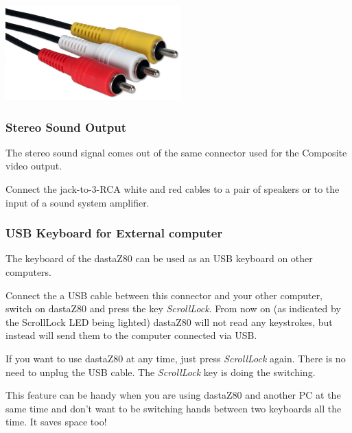         \centerline{\includegraphics[scale=0.5]{images/raspicable_rca.png}}

        \subsubsection{Stereo Sound Output}

        The stereo sound signal comes out of the same connector used for the
        Composite video output.

        Connect the jack-to-3-RCA white and red cables to a pair of speakers or
        to the input of a sound system amplifier.

        \subsubsection{USB Keyboard for External computer}

        The keyboard of the dastaZ80 can be used as an USB keyboard on other
        computers.
        
        Connect the a USB cable between this connector and your other
        computer, switch on dastaZ80 and press the key \textit{ScrollLock}. From
        now on (as indicated by the ScrollLock LED being lighted) dastaZ80 will
        not read any keystrokes, but instead will send them to the computer
        connected via USB.

        If you want to use dastaZ80 at any time, just press \textit{ScrollLock}
        again. There is no need to unplug the USB cable. The \textit{ScrollLock}
        key is doing the switching.

        This feature can be handy when you are using dastaZ80 and another PC at
        the same time and don't want to be switching hands between two keyboards
        all the time. It saves space too!

